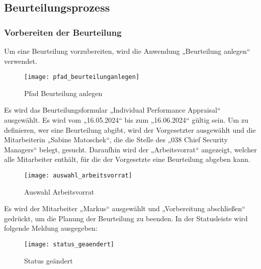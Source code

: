\subsection{Beurteilungsprozess}

\subsubsection{Vorbereiten der Beurteilung}
Um eine Beurteilung vorzubereiten, wird die Anwendung „Beurteilung anlegen“ verwendet.
\begin{figure}[H]
	\centering
	\texttt{[image: pfad\_beurteilunganlegen]}
	\caption{Pfad Beurteilung anlegen}
	\label{fig:pfad_beurteilunganlegen}
\end{figure}
Es wird das Beurteilungsformular „Individual Performance Appraisal“ ausgewählt. Es wird vom „16.05.2024“ bis zum „16.06.2024“ gültig sein. Um zu definieren, wer eine Beurteilung abgibt, wird der Vorgesetzter ausgewählt und die Mitarbeiterin „Sabine Matoschek“, die die Stelle des „038 Chief Security Managers“ belegt, gesucht. Daraufhin wird der „Arbeitsvorrat“ angezeigt, welcher alle Mitarbeiter enthält, für die der Vorgesetzte eine Beurteilung abgeben kann.
\begin{figure}[H]
	\centering
	\texttt{[image: auswahl\_arbeitsvorrat]}
	\caption{Auswahl Arbeitsvorrat}
	\label{fig:auswahl_arbeitsvorrat}
\end{figure}
Es wird der Mitarbeiter „Markus“ ausgewählt und „Vorbereitung abschließen“ gedrückt, um die Planung der Beurteilung zu beenden. In der Statusleiste wird folgende Meldung ausgegeben:
\begin{figure}[H]
	\centering
	\texttt{[image: status\_geaendert]}
	\caption{Status geändert}
	\label{fig:status_geaendert}
\end{figure}

